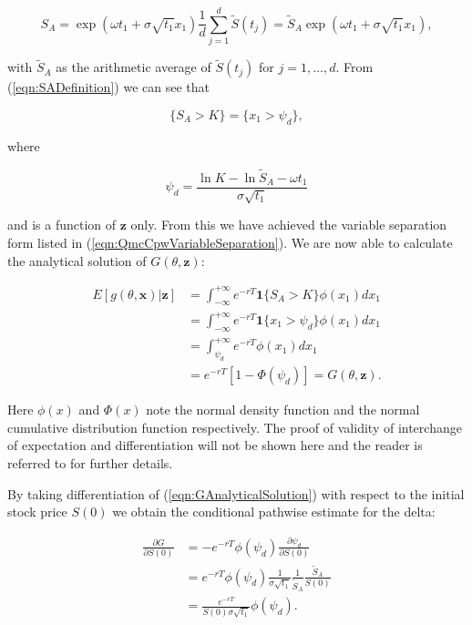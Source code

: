 \begin{equation} \label{eqn:SADefinition}
    S_A = \exp{(\omega t_1 + \sigma \sqrt{t_1}x_1)} \frac{1}{d} \sum_{j=1}^{d}{\widetilde{S}(t_j)} = \widetilde{S}_A \exp{(\omega t_1 + \sigma \sqrt{t_1}x_1)},
\end{equation}

with $\widetilde{S}_A$ as the arithmetic average of $\widetilde{S}(t_j)$ for $j = 1,\dots,d$. From (\ref{eqn:SADefinition}) we can see that

\begin{equation*}
    \{S_A > K\} = \{x_1 > \psi_d\},
\end{equation*}

where

\begin{equation*}
    \psi_d = \frac{\ln{K} - \ln{\widetilde{S}_A} - \omega t_1}{\sigma \sqrt{t_1}}
\end{equation*}

and is a function of $\boldsymbol{z}$ only. From this we have achieved the variable separation form listed in (\ref{eqn:QmcCpwVariableSeparation}). We are now able to calculate the analytical solution of $G(\theta, \boldsymbol{z})$:

\begin{equation} \label{eqn:GAnalyticalSolution}
    \begin{aligned}
    E[g(\theta,\boldsymbol{x})|\boldsymbol{z}] &= \int_{-\infty}^{+\infty}{e^{-rT}\boldsymbol{1}\{S_A > K\}\phi(x_1)dx_1} \\
    &= \int_{-\infty}^{+\infty}{e^{-rT}\boldsymbol{1}\{x_1 > \psi_d\}\phi(x_1)dx_1} \\
    &= \int_{\psi_d}^{+\infty}{e^{-rT}\phi(x_1)dx_1} \\
    &= e^{-rT}[1 - \Phi(\psi_d)] = G(\theta,\boldsymbol{z}).
    \end{aligned}
\end{equation}

Here $\phi(x)$ and $\Phi(x)$ note the normal density function and the normal cumulative distribution function respectively. The proof of validity of interchange of expectation and differentiation will not be shown here and the reader is referred to \cite{ZhangConditionalQuasiMonteCarloMethod} for further details.

By taking differentiation of (\ref{eqn:GAnalyticalSolution}) with respect to the initial stock price $S(0)$ we obtain the conditional pathwise estimate for the delta:

\begin{equation*}
    \begin{aligned}
    \frac{ \partial G }{ \partial S(0)} &= -e^{-rT} \phi(\psi_d) \frac{\partial \psi_d}{ \partial S(0)} \\
    &= e^{-rT} \phi(\psi_d) \frac{1}{\sigma \sqrt{t_1}} \frac{1}{\widetilde{S}_A} \frac{\widetilde{S}_A}{S(0)} \\
    &= \frac{e^{-rT}}{S(0)\sigma \sqrt{t_1}}\phi(\psi_d).
    \end{aligned}
\end{equation*}

